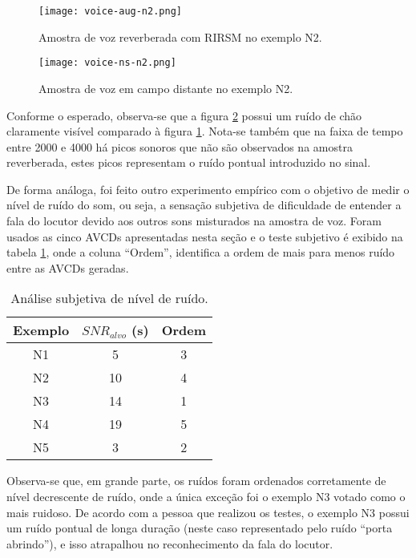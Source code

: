 \begin{figure} [H]
    \centering
    \texttt{[image: voice-aug-n2.png]}
    \caption{Amostra de voz reverberada com RIRSM no exemplo N2.}
    \label{fig:voice-aug-n2}
\end{figure} 

\begin{figure} [H]
    \centering
    \texttt{[image: voice-ns-n2.png]}
    \caption{Amostra de voz em campo distante no exemplo N2.}
    \label{fig:voice-ns-n2}
\end{figure} 

Conforme o esperado, observa-se que a figura \ref{fig:voice-ns-n2} possui um ruído de chão claramente visível comparado à figura \ref{fig:voice-aug-n2}.
Nota-se também que na faixa de tempo entre 2000 e 4000 há picos sonoros que não são observados na amostra reverberada, estes picos representam o ruído pontual
introduzido no sinal.

De forma análoga, foi feito outro experimento empírico com o objetivo de medir o nível de ruído do som, ou seja, 
a sensação subjetiva de dificuldade de entender a fala do locutor devido aos outros sons misturados na amostra de voz.
Foram usados as cinco AVCDs apresentadas nesta seção e o teste subjetivo é exibido na tabela \ref{tbl:noise-exp}, onde
a coluna “Ordem”, identifica a ordem de mais para menos ruído entre as AVCDs geradas.

\begin{table} [H]
    \centering
    \caption{Análise subjetiva de nível de ruído.}
    \label{tbl:noise-exp}
    \begin{tabular}{c|c|c}

        \textbf{Exemplo} & 
        \textbf{$SNR_{alvo}$ (s)} & 
        \textbf{Ordem} \\
        \hline 

        N1 &  5 & 3 \\
        N2 & 10 & 4 \\
        N3 & 14 & 1 \\
        N4 & 19 & 5 \\
        N5 &  3 & 2 \\

    \end{tabular}
\end{table}

Observa-se que, em grande parte, os ruídos foram ordenados corretamente de nível decrescente de ruído, onde a única exceção foi o exemplo N3 votado como 
o mais ruidoso. De acordo com a pessoa que realizou os testes, o exemplo N3 possui um ruído pontual
de longa duração (neste caso representado pelo ruído “porta abrindo”), e isso atrapalhou no reconhecimento da fala do locutor.
